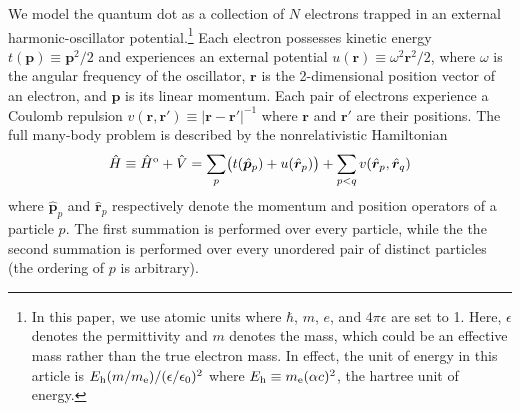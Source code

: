 \documentclass[amsmath, amssymb, aps, floatfix, nofootinbib, preprintnumbers,showpacs, superscriptaddress, twocolumn]{revtex4-1}
\begin{document}
We model the quantum dot as a collection of $N$ electrons trapped in an
external harmonic-oscillator potential.\footnote{In this paper, we use atomic
  units where $\hbar$, $m$, $e$, and $4 \pi \epsilon$ are set to 1.  Here,
  $\epsilon$ denotes the permittivity and $m$ denotes the mass, which could be
  an effective mass rather than the true electron mass.  In effect, the unit
  of energy in this article is
  $E_{\text h} (m / m_{\text e}) / (\epsilon / \epsilon_0)^2$ where
  $E_{\text h} \equiv m_{\text e} (\alpha c)^2$, the hartree unit of energy.}
Each electron possesses kinetic energy $t(\bm p) \equiv \bm p^2 / 2$ and
experiences an external potential $u(\bm r) \equiv \omega^2 \bm r^2 / 2$,
where $\omega$ is the angular frequency of the oscillator, $\bm r$ is the
2-dimensional position vector of an electron, and $\bm p$ is its linear
momentum.  Each pair of electrons experience a Coulomb repulsion
$v(\bm r, \bm r') \equiv |\bm r - \bm r'|^{-1}$ where $\bm r$ and $\bm r'$ are
their positions.  The full many-body problem is described by the
nonrelativistic Hamiltonian
\begin{align*}
  \hat H \equiv \hat H^{\text o} + \hat V = \sum_{p} \bigl(
    t(\hat{\bm p}_p) + u(\hat{\bm r}_p)
  \bigr) + \sum_{p < q} v(\hat{\bm r}_p, \hat{\bm r}_q)
\end{align*}
where $\hat{\bm p}_p$ and $\hat{\bm r}_p$ respectively denote the momentum and
position operators of a particle $p$.  The first summation is performed over
every particle, while the the second summation is performed over every
unordered pair of distinct particles (the ordering of $p$ is arbitrary).
\end{document}
